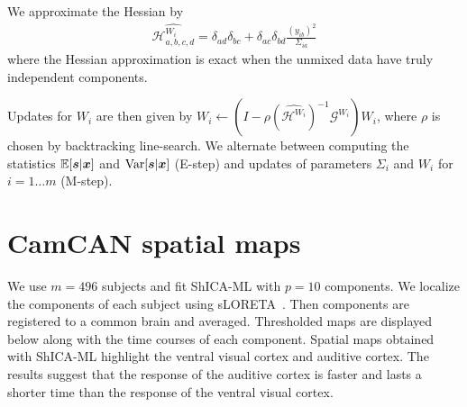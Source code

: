  We approximate the Hessian by
 \begin{align}
 \widehat{\mathcal{H}^{W_i}_{a, b, c, d}} = \delta_{ad} \delta_{bc} + \delta_{ac} \delta_{bd}\frac{(y_{ib})^2}{\Sigma_{ia}}
\end{align}
where the Hessian approximation is exact when the unmixed data have truly independent components.

Updates for $W_i$ are then given by
$W_i \leftarrow (I - \rho (\widehat{\mathcal{H}^{W_i}})^{-1} \mathcal{G}^{W_i}) W_i$, 
where $\rho$ is chosen by backtracking line-search.
We alternate between computing the statistics $\mathbb{E}[\boldsymbol{s}|\boldsymbol{x}]$ and
$\operatorname*{Var}[\boldsymbol{s}|\boldsymbol{x}]$ (E-step) and updates of parameters $\Sigma_i$ and $W_i$ for $i=1 \dots m$ (M-step).





\section{CamCAN spatial maps}
\label{app:shica:maps}
We use $m=496$ subjects and fit ShICA-ML with $p=10$ components. We localize the
components of each subject using sLORETA~\cite{pascual2002standardized}. Then
components are registered to a common brain and averaged. Thresholded maps are
displayed below along with the time courses of each component. Spatial maps obtained with ShICA-ML highlight the ventral visual cortex and auditive cortex. The results suggest that the response of the auditive cortex is faster and lasts a shorter time than the response of the ventral visual cortex.


